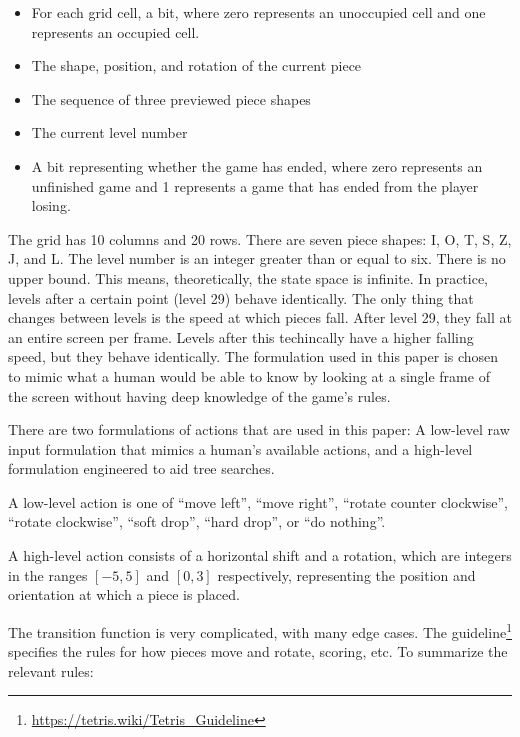 \documentclass[letterpaper]{article} %
\begin{document}
\begin{itemize}
  \item{
        For each grid cell, a bit, where zero represents an unoccupied cell and one represents an occupied cell.
        }
  \item{
        The shape, position, and rotation of the current piece
        }
  \item{
        The sequence of three previewed piece shapes
        }
  \item{
        The current level number
        }
  \item{
        A bit representing whether the game has ended, where zero represents an unfinished game and 1 represents a game that has ended from the player losing.
        }
\end{itemize}

The grid has 10 columns and 20 rows. There are seven piece shapes: I, O, T, S, Z, J, and L. The level number is an integer greater than or equal to six. There is no upper bound. This means, theoretically, the state space is infinite. In practice,
levels after a certain point (level 29) behave identically. The only thing that changes between levels is the speed at which pieces fall. After level 29, they fall at an entire screen per frame. Levels after this techincally have a higher falling speed,
but they behave identically. The formulation used in this paper is chosen to mimic what a human would be able to know by looking at a single frame of the screen without having deep knowledge of the game's rules.

There are two formulations of actions that are used in this paper: A low-level raw input formulation that mimics a human's available actions, and a high-level formulation engineered to aid tree searches.

A low-level action is one of ``move left'', ``move right'', ``rotate counter clockwise'', ``rotate clockwise'', ``soft drop'', ``hard drop'', or ``do nothing''.

A high-level action consists of a horizontal shift and a rotation, which are integers in the ranges \([-5,5]\) and \([0,3]\) respectively, representing the position and orientation at which a piece is placed.

The transition function is very complicated, with many edge cases. The \tetris{} guideline\footnote{\url{https://tetris.wiki/Tetris_Guideline}} specifies the rules for how pieces move and rotate, scoring, etc. To summarize the relevant rules:
\end{document}
